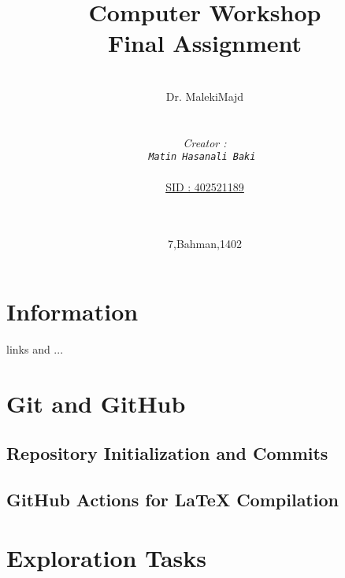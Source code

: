 \documentclass[12pt]{article}
\begin{document}
\title{Computer Workshop\\Final Assignment} 
\date{ 7,Bahman,1402 } %
\author{\\ Dr. MalekiMajd \\ \\ \\ \emph{Creator :}\\ \emph{\texttt{Matin Hasanali Baki }}  \\ \\ \underline{SID :    402521189} \\ \\ \\  }
\maketitle

\newpage
\begin{quote}
\end{quote}
\tableofcontents

\newpage




\section*{Information}
links and ...


\section{Git and GitHub}
\subsection{Repository Initialization and Commits}


\subsection{GitHub Actions for LaTeX Compilation}



\section{Exploration Tasks}
\end{document}
